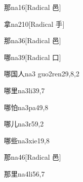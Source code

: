 
\begin{verbete}{那}{na1}{6}[Radical 邑]
\end{verbete}

\begin{verbete}{拿}{na2}{10}[Radical 手]
\end{verbete}

\begin{verbete}{那}{na3}{6}[Radical 邑]
\end{verbete}

\begin{verbete}{哪}{na3}{9}[Radical 口]
\end{verbete}

\begin{verbete}{哪国人}{na3 guo2ren2}{9,8,2}
\end{verbete}

\begin{verbete}{哪里}{na3li3}{9,7}
\end{verbete}

\begin{verbete}{哪怕}{na3pa4}{9,8}
\end{verbete}

\begin{verbete}{哪儿}{na3r5}{9,2}
\end{verbete}

\begin{verbete}{哪些}{na3xie1}{9,8}
\end{verbete}

\begin{verbete}{那}{na4}{6}[Radical 邑]
\end{verbete}

\begin{verbete}{那里}{na4li5}{6,7}
\end{verbete}

